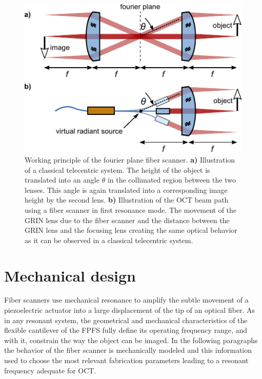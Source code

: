 \documentclass[10pt]{iopart}
\begin{document}
\begin{figure}[h]\centering \includegraphics[width=\columnwidth]{figures/fps2.pdf}
      \caption{Working principle of the fourier plane fiber scanner.
      \textbf{a)} Illustration of a classical telecentric system. The height of the object is translated into an angle $\theta$ in the collimated region between the two lenses. This angle is again translated into a corresponding image height by the second lens.
      \textbf{b)} Illustration of the OCT beam path using a fiber scanner in first resonance mode. The movement of the GRIN lens due to the fiber scanner and the distance between the GRIN lens and the focusing lens creating the same optical behavior as it can be observed in a classical telecentric system.}
      \label{fig:fps}
\end{figure}



\section{Mechanical design}
Fiber scanners use mechanical resonance to amplify the subtle movement of a piezoelectric actuator into a large displacement of the tip of an optical fiber. As in any resonant system, the geometrical and mechanical characteristics of the flexible cantilever of the FPFS fully define its operating frequency range, and with it, constrain the way the object can be imaged. In the following paragraphs the behavior of the fiber scanner is mechanically modeled and this information used to choose the most relevant fabrication parameters leading to a resonant frequency adequate for OCT.
\end{document}
